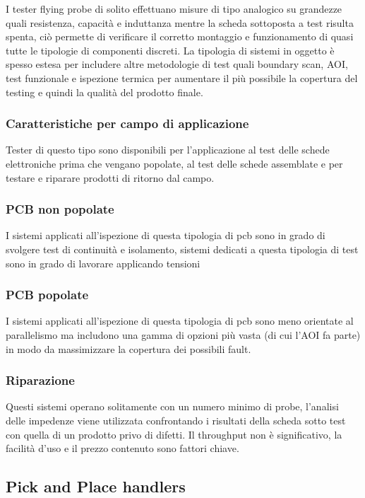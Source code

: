 I tester flying probe di solito effettuano misure di tipo analogico su grandezze quali resistenza, capacità e induttanza mentre la scheda sottoposta a test risulta spenta, ciò permette di verificare il corretto 
montaggio e funzionamento di quasi tutte le tipologie di componenti discreti.  
La tipologia di sistemi in oggetto è spesso estesa per includere altre metodologie di test quali boundary 
scan, AOI, test funzionale e ispezione termica per aumentare il più possibile la copertura del testing e 
quindi la qualità del prodotto finale. 

\subsubsection{Caratteristiche per campo di applicazione}
Tester di questo tipo sono disponibili per l’applicazione al test delle schede elettroniche prima che 
vengano popolate, al test delle schede assemblate e per testare e riparare prodotti di ritorno dal campo. 

\subsubsection{PCB non popolate}
I sistemi applicati all’ispezione di questa tipologia di pcb sono in grado di svolgere test di continuità e 
isolamento, sistemi dedicati a questa tipologia di test sono in grado di lavorare applicando tensioni 

\subsubsection{PCB popolate}
I sistemi applicati all’ispezione di questa tipologia di pcb sono meno orientate al parallelismo ma
includono una gamma di opzioni più vasta (di cui l’AOI fa parte) in modo da massimizzare la copertura dei
possibili fault.

\subsubsection{Riparazione}
Questi sistemi operano solitamente con un numero minimo di probe, l’analisi delle impedenze viene
utilizzata confrontando i risultati della scheda sotto test con quella di un prodotto privo di difetti. Il
throughput non è significativo, la facilità d’uso e il prezzo contenuto sono fattori chiave.

\subsection{Pick and Place handlers}

